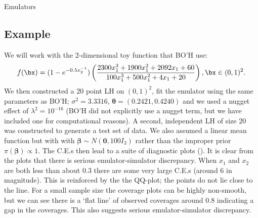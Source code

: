 \begin{chapter}{Emulators \label{Ch:Emulators}}
\subsection{Example}
We will work with the $2$-dimensional toy function that BO'H use:
\begin{equation}
  f(\bx) = (1-e^{-0.5x_2^{-1}})\left( \frac{2300x_1^3 + 1900 x_1^2 + 2092 x_1 + 60}{100 x_1^3 + 500x_1^2 + 4x_1 + 20} \right), \bx \in (0,1)^2.
\end{equation}
We then constructed a $20$ point LH on $(0,1)^2$, fit the emulator using the same parameters as BO'H; $\sigma^2 = 3.3316$, $\bm{\theta} = (0.2421, 0.4240)$ and we used a nugget effect of $\lambda^2 = 10^{-16}$ (BO'H did not explicitly use a nugget term, but we have included one for computational reasons). A second, independent LH of size $20$ was constructed to generate a test set of data. We also assumed a linear mean function but with with $\bm{\beta} \sim N(\bm{0}, 100I_3)$ rather than the improper prior $\pi(\bm{\beta}) \propto 1$. The C.E.s then lead to a suite of diagnostic plots (). It is clear from the plots that there is serious emulator-simulator discrepancy. When $x_1$ and $x_2$ are both less than about $0.3$ there are some very large C.E.s (around $6$ in magnitude). This is reinforced by the the QQ-plot; the points do not lie close to the line. For a small sample size the coverage plots can be highly non-smooth, but we can see there is a `flat line' of observed coverages around $0.8$ indicating a gap in the coverages. This also suggests serious emulator-simulator discrepancy.
 \begin{figure}[H]
   \centering

\end{figure}
\end{chapter}
